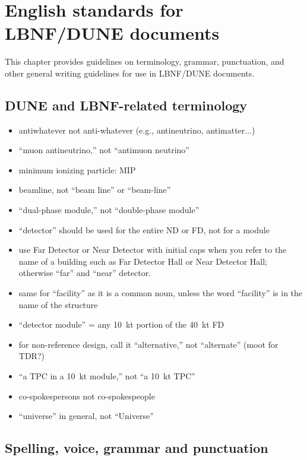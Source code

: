 \chapter{English standards for LBNF/DUNE documents}
\label{ch:english}

This chapter provides guidelines on terminology, grammar, punctuation, and other general writing guidelines for use in LBNF/DUNE documents. 


\section{DUNE and LBNF-related terminology}
\label{sec:english-terminology}

\begin{itemize}
\item antiwhatever not anti-whatever (e.g., antineutrino, antimatter...)
\item ``muon antineutrino,'' not ``antimuon neutrino''
\item minimum ionizing particle: MIP
\item beamline, not ``beam line'' or ``beam-line''
\item ``dual-phase module,'' not ``double-phase module''
\item ``detector'' should be used for the entire ND or FD, not for a module
\item use Far Detector or Near Detector with initial caps when you refer to the name of a building such as Far Detector Hall or Near Detector Hall; otherwise ``far'' and ``near'' detector.
\item same for ``facility'' as it is a common noun, unless the word ``facility'' is in the name of the structure
\item ``detector module'' = any \SI{10}{kt} portion of the \SI{40}{kt} FD
\item for non-reference design, call it ``alternative,'' not ``alternate'' (moot for TDR?)
\item ``a TPC in a \SI{10}{kt} module,'' not ``a \SI{10}{kt}  TPC'' 
\item co-spokespersons not co-spokespeople
\item ``universe'' in general, not ``Universe''
\end{itemize}

\section{Spelling, voice, grammar and punctuation}
\label{sec:english-spelling}

